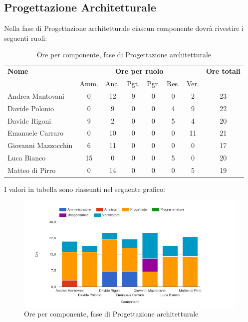\pagebreak
\subsection{Progettazione Architetturale}
Nella fase di Progettazione architetturale ciascun componente dovrà rivestire i seguenti ruoli:

\begin{table}[H]
\begin{tabular}{lccccccc}
\toprule
    \textbf{Nome}  & \multicolumn{6}{c}{\textbf{Ore per ruolo}} & \textbf{Ore totali} \\
     & Amm. & Ana. & Pgt. & Pgr. & Res. & Ver. & \\
    \midrule
    
	Andrea Mantovani & 0 & 12 & 9 & 0 & 0 & 2 & 23 \\
	Davide Polonio & 0 & 9 & 0 & 0 & 4 & 9 & 22 \\
	Davide Rigoni & 9 & 2 & 0 & 0 & 5 & 4 & 20 \\
	Emanuele Carraro & 0 & 10 & 0 & 0 & 0 & 11 & 21 \\
	Giovanni Mazzocchin & 6 & 11 & 0 & 0 & 0 & 0 & 17 \\
	Luca Bianco & 15 & 0 & 0 & 0 & 5 & 0 & 20 \\
	Matteo di Pirro & 0 & 14 & 0 & 0 & 0 & 5 & 19 \\
    
    \bottomrule
\end{tabular}
\caption{Ore per componente, fase di Progettazione architetturale}
\end{table}

I valori in tabella sono riassunti nel seguente grafico: \\ 

    \begin{figure}[H]
      \begin{center}
        \includegraphics[width=12cm]{res/img/orePerComponenteProgettazioneArchitetturale.png}
      \caption{Ore per componente, fase di Progettazione architetturale}
      \end{center} 
    \end{figure}    
    

